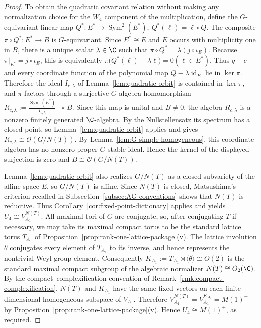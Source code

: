\documentclass[12pt,leqno]{amsart}
\numberwithin{equation}{section} \newtheorem{thm}{Theorem}[section] \newtheorem{lem}[thm]{Lemma} \newtheorem{ex}[thm]{Example} \newtheorem{prop}[thm]{Proposition} \newtheorem{cor}[thm]{Corollary} \newtheorem{defi}[thm]{Definition} \newtheorem{rmk}[thm]{Remark} \newtheorem{notation}[thm]{Notation}
\newcommand{\id}{\operatorname{id}}
\newcommand{\Sym}{\operatorname{Sym}}
\newcommand{\OO}{\mathcal O}
\begin{document}
\begin{proof}
To obtain the quadratic covariant relation without making any normalization choice for the $W_4$ component of the multiplication, define the $G$-equivariant linear map \(Q^*:E^*\longrightarrow\Sym^2(E^*),\ Q^*(\ell)=\ell\circ Q.\) The composite $\pi\circ Q^*:E^*\to B$ is $G$-equivariant. Since $E^*\cong E$ and $E$ occurs with multiplicity one in $B$, there is a unique scalar $\lambda\in\C$ such that \(\pi\circ Q^*=\lambda(j\circ\iota_E).\) Because $\pi|_{E^*}=j\circ\iota_E$, this is equivalently \(\pi\bigl(Q^*(\ell)-\lambda\ell\bigr)=0(\ell\in E^*).\) Thus $q-c$ and every coordinate function of the polynomial map $Q-\lambda\id_E$ lie in $\ker\pi$. Therefore the ideal $I_{c,\lambda}$ of Lemma~\ref{lem:quadratic-orbit} is contained in $\ker\pi$, and $\pi$ factors through a surjective $G$-algebra homomorphism \(R_{c,\lambda}:=\frac{\Sym(E^*)}{I_{c,\lambda}}\twoheadrightarrow B.\) Since this map is unital and $B\ne0$, the algebra $R_{c,\lambda}$ is a nonzero finitely generated $\C$-algebra. By the Nullstellensatz its spectrum has a closed point, so Lemma~\ref{lem:quadratic-orbit} applies and gives \(R_{c,\lambda}\cong\OO(G/N(T)).\) By Lemma~\ref{lem:G-simple-homogeneous}, this coordinate algebra has no nonzero proper $G$-stable ideal. Hence the kernel of the displayed surjection is zero and \(B\cong\OO(G/N(T)).\)

Lemma~\ref{lem:quadratic-orbit} also realizes $G/N(T)$ as a closed subvariety of the affine space $E$, so $G/N(T)$ is affine. Since $N(T)$ is closed, Matsushima's criterion recalled in Subsection~\ref{subsec:AG-conventions} shows that $N(T)$ is reductive. Thus Corollary~\ref{cor:fixed-point-dictionary} applies and yields \(U_4\cong V_{A_1}^{N(T)}.\) All maximal tori of $G$ are conjugate, so, after conjugating $T$ if necessary, we may take its maximal compact torus to be the standard lattice torus $T_{A_1}$ of Proposition~\ref{prop:rank-one-lattice-package}(v). The lattice involution $\theta$ conjugates every element of $T_{A_1}$ to its inverse, and hence represents the nontrivial Weyl-group element. Consequently \(K_{A_1}:=T_{A_1}\rtimes\langle\theta\rangle\cong O(2)\) is the standard maximal compact subgroup of the algebraic normalizer $N(T)\cong O_2(\C)$. By the compact--complexification convention of Remark~\ref{rmk:compact-complexification}, $N(T)$ and $K_{A_1}$ have the same fixed vectors on each finite-dimensional homogeneous subspace of $V_{A_1}$. Therefore \(V_{A_1}^{N(T)}=V_{A_1}^{K_{A_1}}=M(1)^+\) by Proposition~\ref{prop:rank-one-lattice-package}(v). Hence \(U_4\cong M(1)^+\), as required.
\end{proof}
\end{document}

